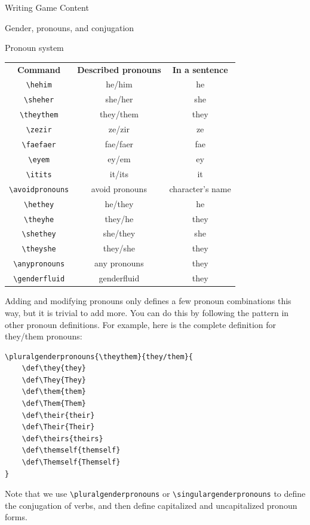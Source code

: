 \documentclass[sheet]{GameTexBase}
\begin{document}
\begin{section}{Writing Game Content}
\begin{subsection}{Gender, pronouns, and conjugation}
\begin{subsubsection}{Pronoun system}
\begin{center}
\begin{tabular}{c|c|c}
\textbf{Command} & \textbf{Described pronouns} & \textbf{In a sentence} \\
\lstinline|\hehim| & he/him & he \\
\lstinline|\sheher| & she/her & she \\
\lstinline|\theythem| & they/them & they \\
\lstinline|\zezir| & ze/zir & ze \\
\lstinline|\faefaer| & fae/faer & fae \\
\lstinline|\eyem| & ey/em & ey \\
\lstinline|\itits| & it/its & it \\
\lstinline|\avoidpronouns| & avoid pronouns & character's name\\
\lstinline|\hethey| & he/they & he \\
\lstinline|\theyhe| & they/he & they \\
\lstinline|\shethey| & she/they & she \\
\lstinline|\theyshe| & they/she & they \\
\lstinline|\anypronouns| & any pronouns & they \\
\lstinline|\genderfluid| & genderfluid & they
\end{tabular}
\end{center}
\end{subsubsection}
\begin{subsubsection}{Adding and modifying pronouns}
\lrstex{} only defines a few pronoun combinations this way, but it is trivial to add more.  You can do this by following the pattern in other pronoun definitions.  For example, here is the complete definition for they/them pronouns:
\begin{verbatim}
\pluralgenderpronouns{\theythem}{they/them}{
	\def\they{they}
	\def\They{They}
	\def\them{them}
	\def\Them{Them}
	\def\their{their}
	\def\Their{Their}
	\def\theirs{theirs}
	\def\themself{themself}
	\def\Themself{Themself}
}
\end{verbatim}
Note that we use \lstinline|\pluralgenderpronouns| or \lstinline|\singulargenderpronouns| to define the conjugation of verbs, and then define capitalized and uncapitalized pronoun forms.


\end{subsubsection}
\end{subsection}
\end{section}
\end{document}
